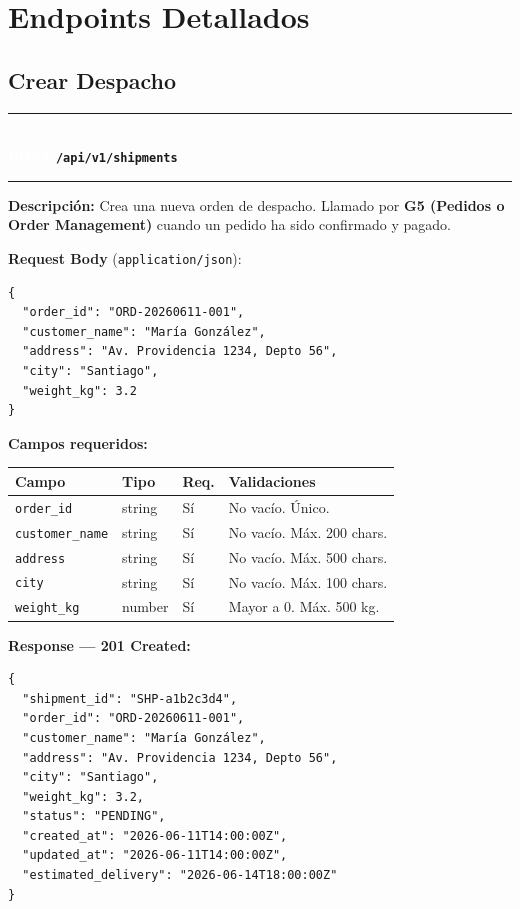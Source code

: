 \documentclass[11pt, a4paper]{article}
\newcommand{\httpmethod}[2]{%
  \colorbox{#1}{\textcolor{white}{\textbf{\small\textsf{#2}}}}%
}
\newcommand{\routeheader}[3]{%
  \noindent\rule{\textwidth}{1.5pt}\\[0.3em]
  \httpmethod{#1}{#2}\;\texttt{\bfseries #3}\\[0.3em]
  \rule{\textwidth}{0.4pt}
  \vspace{0.3cm}
}
\begin{document}
\section{Endpoints Detallados}

\subsection{Crear Despacho}

\routeheader{post}{POST}{/api/v1/shipments}

\textbf{Descripción:} Crea una nueva orden de despacho. Llamado por
\textbf{G5 (Pedidos o Order Management)} cuando un pedido ha sido confirmado y pagado.

\vspace{0.3cm}
\textbf{Request Body} (\texttt{application/json}):

\begin{lstlisting}
{
  "order_id": "ORD-20260611-001",
  "customer_name": "María González",
  "address": "Av. Providencia 1234, Depto 56",
  "city": "Santiago",
  "weight_kg": 3.2
}
\end{lstlisting}

\textbf{Campos requeridos:}
\begin{table}[h!]
\small
\begin{tabularx}{\textwidth}{l l l X}
  \toprule
  \textbf{Campo} & \textbf{Tipo} & \textbf{Req.} & \textbf{Validaciones} \\
  \midrule
  \texttt{order\_id}      & string & Sí & No vacío. Único. \\
  \texttt{customer\_name} & string & Sí & No vacío. Máx. 200 chars. \\
  \texttt{address}        & string & Sí & No vacío. Máx. 500 chars. \\
  \texttt{city}           & string & Sí & No vacío. Máx. 100 chars. \\
  \texttt{weight\_kg}     & number & Sí & Mayor a 0. Máx. 500 kg. \\
  \bottomrule
\end{tabularx}
\end{table}

\textbf{Response --- 201 Created:}

\begin{lstlisting}
{
  "shipment_id": "SHP-a1b2c3d4",
  "order_id": "ORD-20260611-001",
  "customer_name": "María González",
  "address": "Av. Providencia 1234, Depto 56",
  "city": "Santiago",
  "weight_kg": 3.2,
  "status": "PENDING",
  "created_at": "2026-06-11T14:00:00Z",
  "updated_at": "2026-06-11T14:00:00Z",
  "estimated_delivery": "2026-06-14T18:00:00Z"
}
\end{lstlisting}
\end{document}
